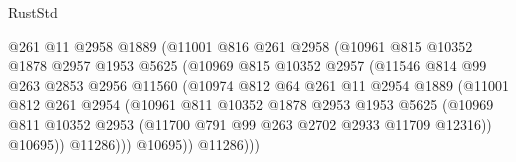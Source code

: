 \begin{lexlean}{RustStd}
\begin{coremodule}
                                  @261
                                  @11
                                  @2958
                                  @1889
                                  (@11001
                                    @816
                                    @261
                                    @2958
                                    (@10961
                                      @815
                                      @10352
                                      @1878
                                      @2957
                                      @1953
                                      @5625
                                      (@10969
                                        @815
                                        @10352
                                        @2957
                                        (@11546
                                          @814
                                          @99
                                          @263
                                          @2853
                                          @2956
                                          @11560
                                          (@10974
                                            @812
                                            @64
                                            @261
                                            @11
                                            @2954
                                            @1889
                                            (@11001
                                              @812
                                              @261
                                              @2954
                                              (@10961
                                                @811
                                                @10352
                                                @1878
                                                @2953
                                                @1953
                                                @5625
                                                (@10969
                                                  @811
                                                  @10352
                                                  @2953
                                                  (@11700 @791 @99 @263 @2702 @2933 @11709 @12316))
                                                @10695))
                                            @11286)))
                                      @10695))
                                  @11286)))

\end{coremodule}
\end{lexlean}
